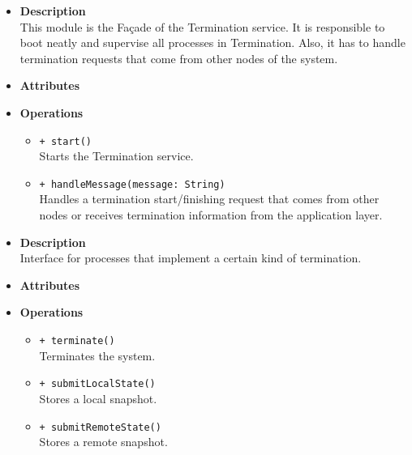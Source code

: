 \FloatBarrier
\begin{itemize}
  \item \textbf{Description} \\
    This module is the Fa\c cade of the Termination service. It is responsible
    to boot neatly and supervise all processes in Termination. Also, it has to
    handle termination requests that come from other nodes of the system.
  \item \textbf{Attributes}
  \item \textbf{Operations}
  \begin{itemize}
    \item \texttt{+ start()} \\
    Starts the Termination service.
    \item \texttt{+ handleMessage(message: String)} \\
    Handles a termination start/finishing request that comes from other nodes
    or receives termination information from the application layer.
  \end{itemize}
\end{itemize}

\FloatBarrier
\begin{itemize}
  \item \textbf{Description} \\
    Interface for processes that implement a certain kind of termination.
  \item \textbf{Attributes}
  \item \textbf{Operations}
  \begin{itemize}
    \item \texttt{+ terminate()} \\
    Terminates the system.
    \item \texttt{+ submitLocalState()} \\
    Stores a local snapshot.
    \item \texttt{+ submitRemoteState()} \\
    Stores a remote snapshot.
  \end{itemize}
\end{itemize}

